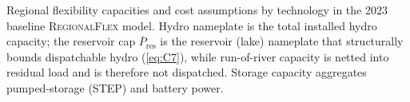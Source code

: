 \documentclass[12pt]{article}
\begin{document}
\begin{table}[H]
\caption{Regional flexibility capacities and cost assumptions by technology in the 2023 baseline \textsc{RegionalFlex} model. Hydro nameplate is the total installed hydro capacity; the reservoir cap $\overline{P}_{\text{res}}$ is the reservoir (lake) nameplate that structurally bounds dispatchable hydro (\cref{eq:C7}), while run-of-river capacity is netted into residual load and is therefore not dispatched. Storage capacity aggregates pumped-storage (STEP) and battery power.}
\label{tab:regional_flex_detailed}
\end{table}
\end{document}
